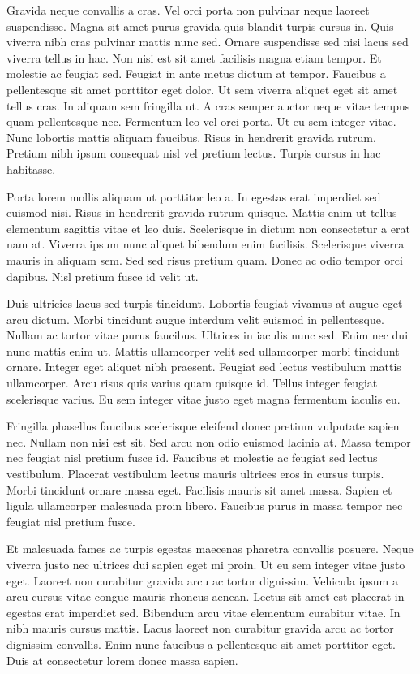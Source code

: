 \documentclass[]{article}
\begin{document}
Gravida neque convallis a cras. Vel orci porta non pulvinar neque laoreet suspendisse. Magna sit amet purus gravida quis blandit turpis cursus in. Quis viverra nibh cras pulvinar mattis nunc sed. Ornare suspendisse sed nisi lacus sed viverra tellus in hac. Non nisi est sit amet facilisis magna etiam tempor. Et molestie ac feugiat sed. Feugiat in ante metus dictum at tempor. Faucibus a pellentesque sit amet porttitor eget dolor. Ut sem viverra aliquet eget sit amet tellus cras. In aliquam sem fringilla ut. A cras semper auctor neque vitae tempus quam pellentesque nec. Fermentum leo vel orci porta. Ut eu sem integer vitae. Nunc lobortis mattis aliquam faucibus. Risus in hendrerit gravida rutrum. Pretium nibh ipsum consequat nisl vel pretium lectus. Turpis cursus in hac habitasse.

Porta lorem mollis aliquam ut porttitor leo a. In egestas erat imperdiet sed euismod nisi. Risus in hendrerit gravida rutrum quisque. Mattis enim ut tellus elementum sagittis vitae et leo duis. Scelerisque in dictum non consectetur a erat nam at. Viverra ipsum nunc aliquet bibendum enim facilisis. Scelerisque viverra mauris in aliquam sem. Sed sed risus pretium quam. Donec ac odio tempor orci dapibus. Nisl pretium fusce id velit ut.

Duis ultricies lacus sed turpis tincidunt. Lobortis feugiat vivamus at augue eget arcu dictum. Morbi tincidunt augue interdum velit euismod in pellentesque. Nullam ac tortor vitae purus faucibus. Ultrices in iaculis nunc sed. Enim nec dui nunc mattis enim ut. Mattis ullamcorper velit sed ullamcorper morbi tincidunt ornare. Integer eget aliquet nibh praesent. Feugiat sed lectus vestibulum mattis ullamcorper. Arcu risus quis varius quam quisque id. Tellus integer feugiat scelerisque varius. Eu sem integer vitae justo eget magna fermentum iaculis eu.

Fringilla phasellus faucibus scelerisque eleifend donec pretium vulputate sapien nec. Nullam non nisi est sit. Sed arcu non odio euismod lacinia at. Massa tempor nec feugiat nisl pretium fusce id. Faucibus et molestie ac feugiat sed lectus vestibulum. Placerat vestibulum lectus mauris ultrices eros in cursus turpis. Morbi tincidunt ornare massa eget. Facilisis mauris sit amet massa. Sapien et ligula ullamcorper malesuada proin libero. Faucibus purus in massa tempor nec feugiat nisl pretium fusce.

Et malesuada fames ac turpis egestas maecenas pharetra convallis posuere. Neque viverra justo nec ultrices dui sapien eget mi proin. Ut eu sem integer vitae justo eget. Laoreet non curabitur gravida arcu ac tortor dignissim. Vehicula ipsum a arcu cursus vitae congue mauris rhoncus aenean. Lectus sit amet est placerat in egestas erat imperdiet sed. Bibendum arcu vitae elementum curabitur vitae. In nibh mauris cursus mattis. Lacus laoreet non curabitur gravida arcu ac tortor dignissim convallis. Enim nunc faucibus a pellentesque sit amet porttitor eget. Duis at consectetur lorem donec massa sapien.
\end{document}
